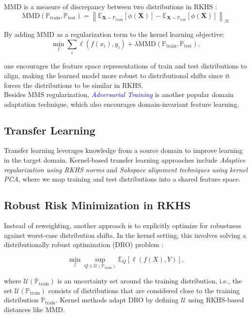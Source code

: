 MMD is a measure of discrepancy between two distributions in RKHS \citep{Gretton2012}:
\begin{equation}
    \text{MMD}(\mathbb{P}_{\text{train}}, \mathbb{P}_{\text{test}}) = \left\| \mathbb{E}_{\boldsymbol{X} \sim \mathbb{P}_{\text{train}}} [\phi(\boldsymbol{X})] - \mathbb{E}_{\boldsymbol{X} \sim \mathbb{P}_{\text{test}}} [\phi(\boldsymbol{X})] \right\|_{\mathcal{H}}
    \label{eqn:3.23}
\end{equation}

\vspace{1em}
By adding MMD as a regularization term to the kernel learning objective:
\begin{equation}
    \min_f \sum_i \ell(f(x_i), y_i) + \lambda \text{MMD}(\mathbb{P}_{\text{train}}, \mathbb{P}_{\text{test}}),
    \label{eqn:3.24}
\end{equation}

one encourages the feature space representations of train and test 
distributions to align, making the learned model more robust to distributional shifts since it forces the distributions to be similar in RKHS.\\

Besides MMS regularization, \textcolor{blue}{\emph{Adversarial Training}} is another popular domain adaptation technique, which also encourages domain-invariant feature learning.

\subsection{Transfer Learning}

Transfer learning leverages knowledge from a source domain to improve learning in the target domain. Kernel-based transfer learning approaches include \emph{Adaptive regularization using RKHS norms} \citep{bach2024learning} and \emph{Subspace alignment techniques using kernel PCA}, where we map training and test distributions into a shared feature space.

\subsection{Robust Risk Minimization in RKHS}

Instead of reweighting, another approach is to explicitly optimize for robustness against worst-case distribution shifts. In the kernel setting, this involves solving a distributionally robust optimization (DRO) problem \citep{Rahimian2019}:

\begin{equation}
     \min_{f} \sup_{Q \in \mathcal{U}(\mathbb{P}_{\text{train}})} \mathbb{E}_{Q}[\ell(f(X), Y)],
     \label{eqn:3.25}
\end{equation}

where $\mathcal{U}(\mathbb{P}_{\text{train}})$ is an uncertainty set around the training distribution, i.e., the set $\mathcal{U}(\mathbb{P}_{\text{train}})$ consists of distributions that are considered close to the training distribution $\mathbb{P}_{\text{train}}$. Kernel methods adapt DRO by defining $\mathcal{U}$ using RKHS-based distances like MMD.